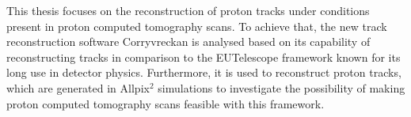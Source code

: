 This thesis focuses on the reconstruction of proton tracks under conditions present in proton computed tomography scans. To achieve that, the new track reconstruction software
Corryvreckan \cite{corryvreckan} is analysed based on its capability of reconstructing tracks in comparison to the EUTelescope framework \cite{gbl} known
for its long use in detector physics. Furthermore,
it is used to reconstruct
proton tracks, which are generated in Allpix$^2$ \cite{allpix} simulations to investigate the possibility of making proton computed tomography scans feasible with this framework.




%
